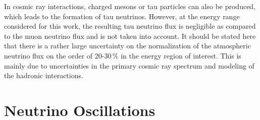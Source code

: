 In cosmic ray interactions, charged mesons or tau particles can also be produced, which leads to the formation of tau neutrinos.
However, at the energy range considered for this work, the resulting tau neutrino flux is negligible as compared to the muon neutrino flux \cite{2015EPJWC..9908001F_lepton_fluxes} and is not taken into account.
It should be stated here that there is a rather large uncertainty on the normalization of the atmospheric neutrino flux on the order of 20-30\,\% \cite{PhysRevD.75.043006_neutino_flux_honda} in the energy region of interest.
This is mainly due to uncertainties in the primary cosmic ray spectrum and modeling of the hadronic interactions.


\section{Neutrino Oscillations} \label{sec:neutrino_oscillations}

